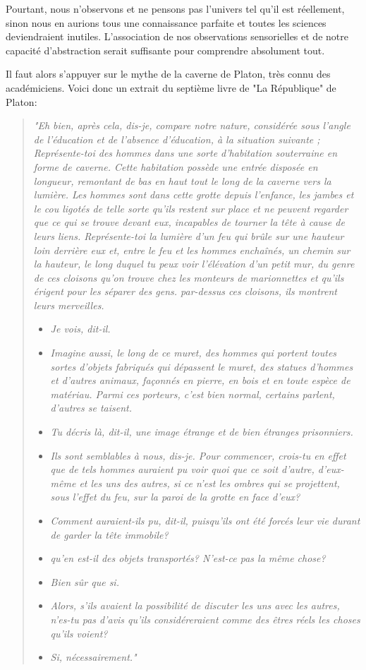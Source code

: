 Pourtant, nous n’observons et ne pensons pas l’univers tel qu’il est réellement, sinon nous en aurions tous une connaissance parfaite et toutes les sciences deviendraient inutiles. L’association de nos observations sensorielles et de notre capacité d’abstraction serait suffisante pour comprendre absolument tout.

Il faut alors s’appuyer sur le mythe de la caverne de Platon, très connu des académiciens. Voici donc un extrait du septième livre de "La République" de Platon:

\begin{quote}
\textit{"Eh bien, après cela, dis-je, compare notre nature, considérée sous l’angle de l’éducation et de l’absence d’éducation, à la situation suivante ; Représente-toi des hommes dans une sorte d’habitation souterraine en forme de caverne. Cette habitation possède une entrée disposée en longueur, remontant de bas en haut tout le long de la caverne vers la lumière. Les hommes sont dans cette grotte depuis l’enfance, les jambes et le cou ligotés de telle sorte qu’ils restent sur place et ne peuvent regarder que ce qui se trouve devant eux, incapables de tourner la tête à cause de leurs liens.
Représente-toi la lumière d’un feu qui brûle sur une hauteur loin derrière eux et, entre le feu et les hommes enchaînés, un chemin sur la hauteur, le long duquel tu peux voir l’élévation d’un petit mur, du genre de ces cloisons qu’on trouve chez les monteurs de marionnettes et qu’ils érigent pour les séparer des gens. par-dessus
ces cloisons, ils montrent leurs merveilles.}
\begin{itemize}
\item \textit{Je vois, dit-il.}
\item \textit{Imagine aussi, le long de ce muret, des hommes qui portent toutes sortes d’objets fabriqués qui dépassent le muret, des statues d’hommes et d’autres animaux, façonnés en pierre, en bois et en toute espèce de matériau. Parmi ces porteurs, c’est bien normal, certains parlent, d’autres se taisent.}
\item \textit{Tu décris là, dit-il, une image étrange et de bien étranges prisonniers.}
\item \textit{Ils sont semblables à nous, dis-je. Pour commencer, crois-tu en effet que de tels hommes auraient pu voir quoi que ce soit d’autre, d’eux-même et les uns des autres, si ce n’est les ombres qui se projettent, sous l’effet du feu, sur la paroi de la grotte en face d’eux?}
\item \textit{Comment auraient-ils pu, dit-il, puisqu’ils ont été forcés leur vie durant de garder la tête immobile?}
\item \textit{qu’en est-il des objets transportés? N’est-ce pas la même chose?}
\item \textit{Bien sûr que si.}
\item \textit{Alors, s’ils avaient la possibilité de discuter les uns avec les autres, n’es-tu pas d’avis qu’ils considéreraient comme des êtres réels les choses qu’ils voient?}
\item \textit{Si, nécessairement."}
\end{itemize}
\end{quote}

